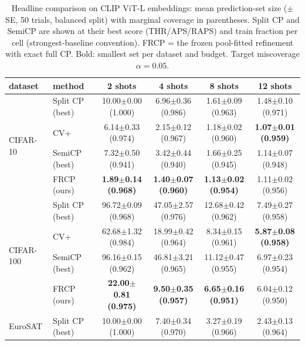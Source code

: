 \begin{table}[t]
\centering
\small
\caption{Headline comparison on CLIP ViT-L embeddings: mean prediction-set size ($\pm$ SE, 50 trials, balanced split) with marginal coverage in parentheses. Split CP and SemiCP are shown at their best score (THR/APS/RAPS) and train fraction per cell (strongest-baseline convention). FRCP = the frozen pool-fitted refinement with exact full CP. Bold: smallest set per dataset and budget. Target miscoverage $\alpha=0.05$.}
\label{tab:headline-clipl-a005}
\begin{tabular}{llcccc}
\toprule
dataset & method & 2 shots & 4 shots & 8 shots & 12 shots\\
\midrule
\multirow{4}{*}{CIFAR-10} & Split CP (best) & 10.00$\pm$0.00 {\scriptsize(1.000)} & 6.96$\pm$0.36 {\scriptsize(0.986)} & 1.61$\pm$0.09 {\scriptsize(0.963)} & 1.48$\pm$0.10 {\scriptsize(0.971)}\\
 & CV+ & 6.14$\pm$0.33 {\scriptsize(0.974)} & 2.15$\pm$0.12 {\scriptsize(0.967)} & 1.18$\pm$0.02 {\scriptsize(0.960)} & \textbf{1.07$\pm$0.01 {\scriptsize(0.959)}}\\
 & SemiCP (best) & 7.32$\pm$0.50 {\scriptsize(0.941)} & 3.42$\pm$0.44 {\scriptsize(0.940)} & 1.66$\pm$0.25 {\scriptsize(0.945)} & 1.14$\pm$0.07 {\scriptsize(0.948)}\\
 & FRCP (ours) & \textbf{1.89$\pm$0.14 {\scriptsize(0.968)}} & \textbf{1.40$\pm$0.07 {\scriptsize(0.960)}} & \textbf{1.13$\pm$0.02 {\scriptsize(0.954)}} & 1.11$\pm$0.02 {\scriptsize(0.956)}\\
\midrule
\multirow{4}{*}{CIFAR-100} & Split CP (best) & 96.72$\pm$0.09 {\scriptsize(0.968)} & 47.05$\pm$2.57 {\scriptsize(0.976)} & 12.68$\pm$0.42 {\scriptsize(0.962)} & 7.49$\pm$0.27 {\scriptsize(0.958)}\\
 & CV+ & 62.68$\pm$1.32 {\scriptsize(0.984)} & 18.99$\pm$0.42 {\scriptsize(0.964)} & 8.34$\pm$0.15 {\scriptsize(0.961)} & \textbf{5.87$\pm$0.08 {\scriptsize(0.958)}}\\
 & SemiCP (best) & 96.16$\pm$0.15 {\scriptsize(0.962)} & 46.81$\pm$3.21 {\scriptsize(0.965)} & 11.12$\pm$0.47 {\scriptsize(0.955)} & 6.97$\pm$0.23 {\scriptsize(0.954)}\\
 & FRCP (ours) & \textbf{22.00$\pm$0.81 {\scriptsize(0.975)}} & \textbf{9.50$\pm$0.35 {\scriptsize(0.957)}} & \textbf{6.65$\pm$0.16 {\scriptsize(0.951)}} & 6.04$\pm$0.12 {\scriptsize(0.950)}\\
\midrule
\multirow{4}{*}{EuroSAT} & Split CP (best) & 10.00$\pm$0.00 {\scriptsize(1.000)} & 7.40$\pm$0.34 {\scriptsize(0.970)} & 3.27$\pm$0.19 {\scriptsize(0.966)} & 2.43$\pm$0.13 {\scriptsize(0.964)}\\

\end{tabular}
\end{table}
